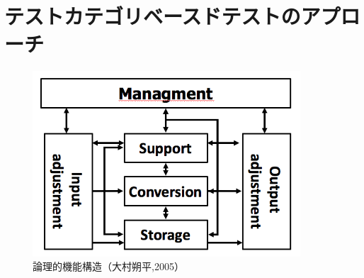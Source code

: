 \documentclass[a4paper,11pt]{jreport}
\begin{document}
\section{テストカテゴリベースドテストのアプローチ}

\begin{figure}[h]
  \begin{center}
  \includegraphics[width=10cm]{./image/D-3-Fig2.png}
  \caption{論理的機能構造（大村朔平,2005）}
  \label{fig:D-3-Fig2}
  \end{center}
   \end{figure}
\end{document}
